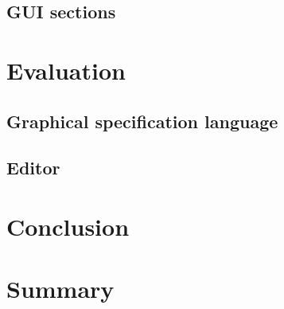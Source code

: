 \documentclass[twoside, openright, 12pt]{book}
\begin{document}
	
\section{GUI sections}
\label{implementation_sections}




\cleardoublepage
\chapter{Evaluation}
\label{evaluation}


\section{Graphical specification language}
\label{evaluation_gsl}


\section{Editor}
\label{evaluation_editor}


\cleardoublepage
\chapter{Conclusion}
\label{conclusion}
\blindtext



\cleardoublepage
\chapter{Summary}
\label{summary}
\blindtext







\cleardoublepage
\DeclareRobustCommand{\citeext}[1]{\citeauthor{#1}~\cite{#1}}




\end{document}
